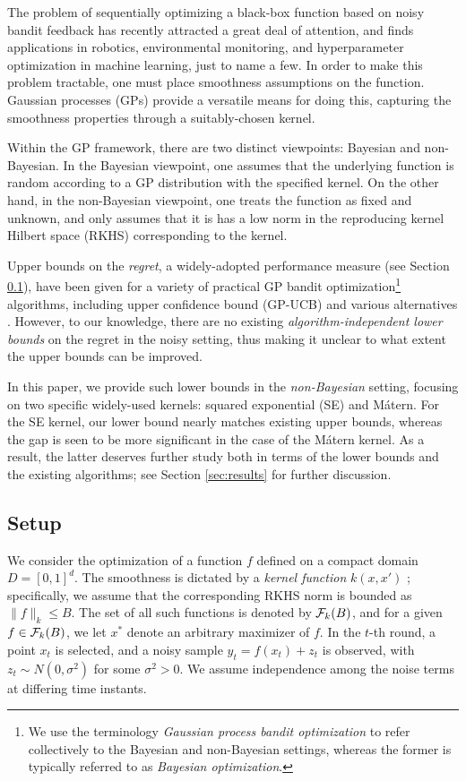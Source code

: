 \documentclass[english,onecolumn,final,11pt]{IEEEtran} %
\begin{document}
The problem of sequentially optimizing a black-box function based on noisy bandit feedback has recently attracted a great deal of attention, and finds applications in robotics, environmental monitoring, and hyperparameter optimization in machine learning, just to name a few.  In order to make this problem tractable, one must place smoothness assumptions on the function.  Gaussian processes (GPs) provide a versatile means for doing this, capturing the smoothness properties through a suitably-chosen kernel.

Within the GP framework, there are two distinct viewpoints: Bayesian and non-Bayesian.  In the Bayesian viewpoint, one assumes that the underlying function is random according to a GP distribution with the specified kernel.  On the other hand, in the non-Bayesian viewpoint, one treats the function as fixed and unknown, and only assumes that it is has a low norm in the reproducing kernel Hilbert space (RKHS) corresponding to the kernel.

Upper bounds on the \emph{regret}, a widely-adopted performance measure (see Section \ref{sec:setup}), have been given for a variety of practical GP bandit optimization\footnote{We use the terminology \emph{Gaussian process bandit optimization} to refer collectively to the Bayesian and non-Bayesian settings, whereas the former is typically referred to as \emph{Bayesian optimization}.} algorithms, including upper confidence bound (GP-UCB) \cite{Sri09} and various alternatives \cite{Rus14,Wan16,Bog16a}.  However, to our knowledge, there are no existing \emph{algorithm-independent lower bounds} on the regret in the noisy setting, thus making it unclear to what extent the upper bounds can be improved.

In this paper, we provide such lower bounds in the \emph{non-Bayesian} setting, focusing on two specific widely-used kernels: squared exponential (SE) and M\'atern.  For the SE kernel, our lower bound nearly matches existing upper bounds, whereas the gap is seen to be more significant in the case of the M\'atern kernel.  As a result, the latter deserves further study both in terms of the lower bounds and the existing algorithms; see Section \ref{sec:results} for further discussion.

\subsection{Setup} \label{sec:setup}

We consider the optimization of a function $f$ defined on a compact domain $D = [0,1]^d$.  The smoothness is dictated by a \emph{kernel function} $k(x,x')$ \cite{Ras06}; specifically, we assume that the corresponding RKHS norm is bounded as $\|f\|_{k} \le B$.  The set of all such functions is denoted by $\mathcal{F}_k(B)$, and for a given $f \in \mathcal{F}_k(B)$, we let $x^*$ denote an arbitrary maximizer of $f$.  In the $t$-th round, a point $x_t$ is selected, and a noisy sample $y_t = f(x_t) + z_t$ is observed, with $z_t \sim N(0,\sigma^2)$ for some $\sigma^2 > 0$.  We assume independence among the noise terms at differing time instants.
\end{document}
